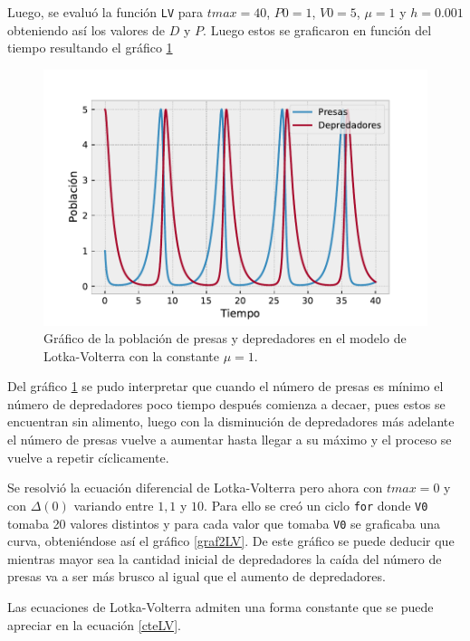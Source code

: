 \documentclass[../portafolio.tex]{subfiles}
\begin{document}
\vspace{5mm}
Luego, se evaluó la función \texttt{LV} para $tmax=40$, $P0=1$, $V0=5$, $\mu=1$ y $h=0.001$ obteniendo así los valores de $D$ y $P$. Luego estos se graficaron en función del tiempo resultando el gráfico \ref{graf1LV}
\vspace{5mm}


\begin{figure}
    \centering
    \includegraphics[scale=0.85]{tex/img/edo-ej-c.pdf}
    \caption{Gráfico de la población de presas y depredadores en el modelo de Lotka-Volterra con la constante $\mu=1$.}
    \label{graf1LV}
\end{figure}

Del gráfico \ref{graf1LV} se pudo interpretar que cuando el número de presas es mínimo el número de depredadores poco tiempo después comienza a decaer, pues estos se encuentran sin alimento, luego con la disminución de depredadores más adelante el número de presas vuelve a aumentar hasta llegar a su máximo y el proceso se vuelve a repetir cíclicamente.

\vspace{5mm}
Se resolvió la ecuación diferencial de Lotka-Volterra pero ahora con $tmax=0$ y con $\Delta(0)$ variando entre $1,1$ y $10$. Para ello se creó un ciclo \texttt{for} donde \texttt{V0} tomaba 20 valores distintos y para cada valor que tomaba \texttt{V0} se graficaba una curva, obteniéndose así el gráfico \ref{graf2LV}. De este gráfico se puede deducir que mientras mayor sea la cantidad inicial de depredadores la caída del número de presas va a ser más brusco al igual que el aumento de depredadores.

\vspace{2mm}
Las ecuaciones de Lotka-Volterra admiten una forma constante que se puede apreciar en la ecuación \ref{cteLV}.
\end{document}
